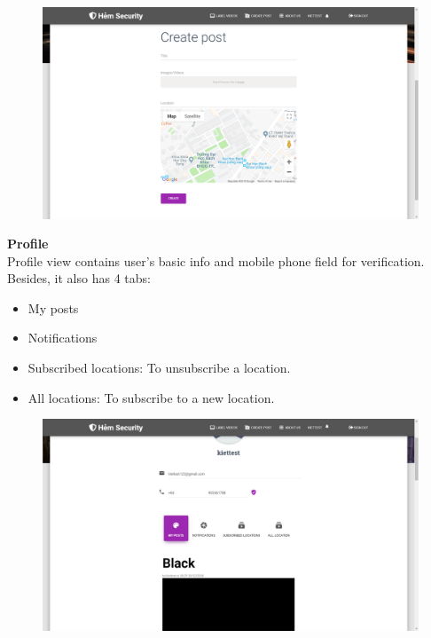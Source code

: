 \begin{center}
    \begin{figure}[H]
    \centering
    \includegraphics[width=1\columnwidth]{images/chap4/create_post.png}
    \end{figure}
\end{center}
\textbf{Profile}
\\
Profile view contains user's basic info and mobile phone field for verification. Besides, it also has 4 tabs:  
\begin{itemize}
\item My posts
\item Notifications
\item Subscribed locations: To unsubscribe a location.
\item All locations: To subscribe to a new location.
\end{itemize}
\begin{center}
    \begin{figure}[H]
    \centering
    \includegraphics[width=1\columnwidth]{images/chap4/profile.png}
    \end{figure}
\end{center}
